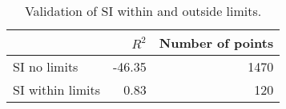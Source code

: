 
\begin{table}[H]
    \centering
    \caption{Validation of SI within and outside limits.}
   \begin{tabular}{lrr}
\toprule
{} &  $R^2$ &  Number of points \\
\midrule
SI no limits     & -46.35 &              1470 \\
SI within limits &   0.83 &               120 \\
\bottomrule
\end{tabular}

    \label{tab:si_validation}
\end{table}
    